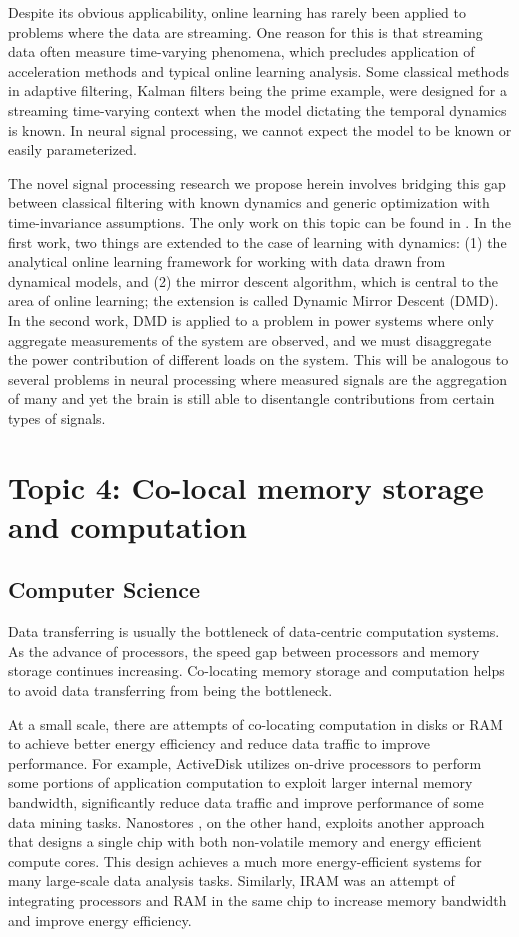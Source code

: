 \documentclass[12pt]{report}
\begin{document}
Despite its obvious applicability, online learning has rarely been applied to problems where the data are streaming. One reason for this is that streaming data often measure time-varying phenomena, which precludes application of acceleration methods and typical online learning analysis. Some classical methods in adaptive filtering, Kalman filters being the prime example, were designed for a streaming time-varying context when the model dictating the temporal dynamics is known. In neural signal processing, we cannot expect the model to be known or easily parameterized.

The novel signal processing research we propose herein involves bridging this gap between classical filtering with known dynamics and generic optimization with time-invariance assumptions. The only work on this topic can be found in \cite{hall_online_2013, ledva2015inferring}. In the first work, two things are extended to the case of learning with dynamics: (1) the analytical online learning framework for working with data drawn from dynamical models, and (2) the mirror descent algorithm, which is central to the area of online learning; the extension is called Dynamic Mirror Descent (DMD). In the second work, DMD is applied to a problem in power systems where only aggregate measurements of the system are observed, and we must disaggregate the power contribution of different loads on the system. This will be analogous to several problems in neural processing where measured signals are the aggregation of many and yet the brain is still able to disentangle contributions from certain types of signals.

\section*{Topic 4: Co-local memory storage and computation}

\subsection{Computer Science}
Data transferring is usually the bottleneck of data-centric computation systems.
As the advance of processors, the speed gap between processors and memory
storage continues increasing. Co-locating memory storage and computation helps
to avoid data transferring from being the bottleneck.

At a small scale, there are attempts of co-locating computation in disks or RAM
to achieve better energy efficiency and reduce data traffic to improve
performance. For example, ActiveDisk \cite{riedel01, cho13} utilizes on-drive
processors to
perform some portions of application computation to exploit larger internal
memory bandwidth, significantly reduce data traffic and improve performance of
some data mining tasks. Nanostores \cite{nanostores}, on the other hand, exploits another
approach that designs a single chip with both non-volatile memory and energy
efficient compute cores. This design achieves a much more energy-efficient
systems for many large-scale data analysis tasks. Similarly, IRAM \cite{iram} was an
attempt of integrating processors and RAM in the same chip to increase memory
bandwidth and improve energy efficiency.
\end{document}
